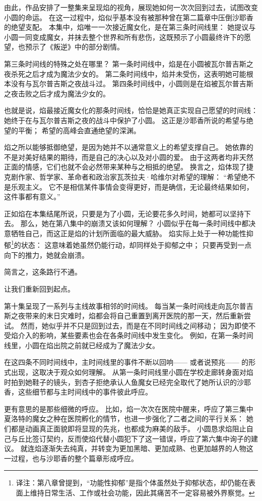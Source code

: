 由此，作品安排了一整集来呈现焰的视角，展现她如何一次次回到过去，试图改变小圆的命运。
在这一过程中，焰似乎基本没有被那种曾在第二篇章中压倒沙耶香的绝望支配。
本集中，焰唯一一次接近魔女化，是在第三条时间线里：
她提议与小圆一同变成魔女，并抹去整个世界和所有悲伤，这既预示了小圆最终许下的愿望，也预示了《叛逆》中的部分剧情。

第三条时间线的特殊之处在哪里？
第一条时间线中，焰是在小圆被瓦尔普吉斯之夜杀死之后才成为魔法少女的。
第二条时间线中，焰并未受伤，这表明她可能根本没有与瓦尔普吉斯之夜战斗过。
第四条时间线中，小圆则是在焰被瓦尔普吉斯之夜击败之后才成为魔法少女的。

也就是说，焰最接近魔女化的那条时间线，恰恰是她真正实现自己愿望的时间线：
她终于在与瓦尔普吉斯之夜的战斗中保护了小圆。
这正是沙耶香所说的希望与绝望的平衡；
希望的高峰会直通绝望的深渊。

焰之所以能够抵御绝望，是因为她并不以通常意义上的希望支撑自己。
她依靠的不是对美好结果的期待，而是自己的决心以及对小圆的爱。
由于这两者均非天然正面的情感，它们也就不会必然带来某种与之相抵的绝望。
换言之，焰体现了捷克剧作家、哲学家、革命者和政治家瓦茨拉夫·哈维尔对希望的理解：
“希望绝不是乐观主义。
它不是相信某件事情会变得更好，而是确信，无论最终结果如何，这件事都有意义。”
\cite{ref64}

正如焰在本集结尾所说，只要是为了小圆，无论要花多久时间，她都可以坚持下去。
那么，她在第八集中的崩溃又该如何理解？
小圆似乎在每一条时间线中都决意牺牲自己，而这正是焰的计划所面临的最大威胁。
焰实际上处于一种功能性抑郁\footnote{%
    译注：第八章曾提到，“功能性抑郁”是指个体虽然处于抑郁状态，却仍能在表面上维持日常生活、工作或社会功能，因此其痛苦不一定容易被外界察觉。
}的状态：
这意味着她虽然仍能行动，却同样处于抑郁之中；
只要再受到一点向下的推力，她就会崩溃。

简言之，这条路行不通。

让我们重新回到起点。

第十集呈现了一系列与主线故事相邻的时间线。
每当某一条时间线走向瓦尔普吉斯之夜带来的末日灾难时，焰都会将自己重置到离开医院的那一天，然后重新尝试。
然而，她似乎并不只是回到过去，而是在不同时间线之间移动；
因为即使不受焰介入的影响，某些要素也会在各条时间线中发生变化。
例如，在第一条时间线里，小圆在焰出院之前就已经成为了魔法少女。

在这四条不同时间线中，主时间线里的事件不断以回响——
或者说预兆——
的形式出现，这取决于观众如何理解。
从第一条时间线里小圆在学校走廊转身面对焰时拍到她鞋子的镜头，到杏子拒绝承认人鱼魔女已经完全取代了她所认识的沙耶香，这些细节都与主时间线中的事件彼此呼应。

更有意思的是那些细微的呼应。
比如，焰一次次在医院中醒来，呼应了第三集中夏洛特的魔女之种在医院孵化的情节，也进一步强化了二者之间的平行关系：
她们都是动画真正面貌即将显现的先兆，也都成为麻美的敌手。
小圆恳求焰阻止自己与丘比签订契约，反而使焰代替小圆犯下了这一错误，呼应了第六集中询子的建议。
就连焰逐渐失去纯真，并转变为更加黑暗、更加成熟、也更加越界的人物这一过程，也与沙耶香的整个篇章形成呼应。

